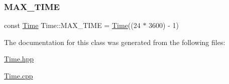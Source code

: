 \subsubsection{\texorpdfstring{M\+A\+X\+\_\+\+T\+I\+ME}{MAX\_TIME}}
{\footnotesize\ttfamily const \hyperlink{classTime}{Time} Time\+::\+M\+A\+X\+\_\+\+T\+I\+ME = \hyperlink{classTime}{Time}((24 $\ast$ 3600) -\/ 1)\hspace{0.3cm}{\ttfamily [static]}}



The documentation for this class was generated from the following files\+:\begin{DoxyCompactItemize}
\item 
\hyperlink{Time_8hpp}{Time.\+hpp}\item 
\hyperlink{Time_8cpp}{Time.\+cpp}\end{DoxyCompactItemize}
